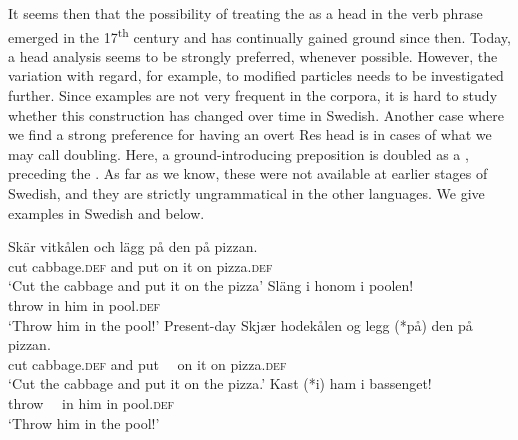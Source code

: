 \documentclass[output=paper]{langscibook}
\begin{document}
\ea\label{ex:lalu:68}
\z
\ex\label{ex:lalu:69}
\z
\z


It seems then that the possibility of treating the  as a head in the verb phrase emerged in the 17\textsuperscript{th} century and has continually gained ground since then. Today, a head analysis seems to be strongly preferred, whenever possible. However, the variation with regard, for example, to modified particles needs to be investigated further. Since examples are not very frequent in the corpora, it is hard to study whether this construction has changed over time in Swedish. Another case where we find a strong preference for having an overt Res head is in cases of what we may call  doubling. Here, a ground-introducing preposition is doubled as a , preceding the . As far as we know, these were not available at earlier stages of Swedish, and they are strictly ungrammatical in the other  languages. We give examples in Swedish  and   below.


\ea {}\label{ex:lalu:70}
\ea
\gll  Skär  vitkålen       och  lägg  på   den  på  pizzan.\\
    cut      cabbage.\textsc{def}  and   put   on   it   on   pizza.\textsc{def}\\
\glt `Cut the cabbage and put it on the pizza'
\ex
\gll  Släng   i   honom   i     poolen! \\
    throw   in   him     in     pool\textsc{.def}\\
\glt `Throw him in the pool!'
\z
\ex Present-day \label{ex:lalu:71}
\ea
\gll  Skjær  hodekålen    og   legg  (*på)  den  på   pizzan.\\
    cut    cabbage.\textsc{def}  and  put   ~~on   it     on   pizza.\textsc{def}\\
    \glt `Cut the cabbage and put it on the pizza.'
\ex
\gll  Kast   (*i)   ham   i   bassenget! \\
    throw   ~~in   him   in   pool.\textsc{def}\\
\glt `Throw him in the pool!'
\z
\z
\end{document}
